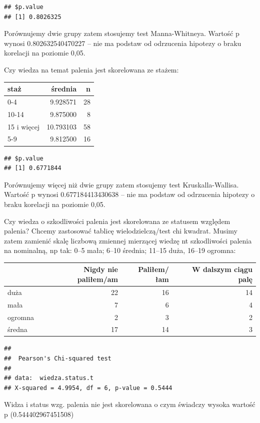 \documentclass[
  openany]{book}
\begin{document}
\begin{verbatim}
## $p.value
## [1] 0.8026325
\end{verbatim}

Porównujemy dwie grupy zatem stosujemy test Manna-Whitneya.
Wartość p wynosi 0.802632540470227 -- nie ma podstaw
od odrzucenia hipotezy o braku korelacji na poziomie 0,05.

Czy wiedza na temat palenia jest skorelowana ze stażem:

\begin{tabular}{l|r|r}
\hline
staż & średnia & n\\
\hline
0-4 & 9.928571 & 28\\
\hline
10-14 & 9.875000 & 8\\
\hline
15 i więcej & 10.793103 & 58\\
\hline
5-9 & 9.812500 & 16\\
\hline
\end{tabular}

\begin{verbatim}
## $p.value
## [1] 0.6771844
\end{verbatim}

Porównujemy więcej niż dwie grupy zatem stosujemy test Kruskalla-Wallisa.
Wartość p wynosi 0.677184413430638 -- nie ma podstaw
od odrzucenia hipotezy o braku korelacji na poziomie 0,05.

Czy wiedza o szkodliwości palenia jest skorelowana
ze statusem względem palenia? Chcemy zastosować tablicę wielodzielczą/test chi kwadrat. Musimy zatem zamienić skalę liczbową zmiennej mierzącej wiedzę nt szkodliwości palenia na nominalną, np tak:
0--5 mała; 6--10 średnia; 11--15 duża, 16--19 ogromna:

\begin{tabular}{l|r|r|r}
\hline
  & Nigdy nie paliłem/am & Paliłem/łam & W dalszym ciągu palę\\
\hline
duża & 22 & 16 & 14\\
\hline
mała & 7 & 6 & 4\\
\hline
ogromna & 2 & 3 & 2\\
\hline
średna & 17 & 14 & 3\\
\hline
\end{tabular}

\begin{verbatim}
## 
##  Pearson's Chi-squared test
## 
## data:  wiedza.status.t
## X-squared = 4.9954, df = 6, p-value = 0.5444
\end{verbatim}

Widza i status wzg. palenia nie jest skorelowana
o czym świadczy wysoka wartość p (0.544402967451508)
\end{document}
